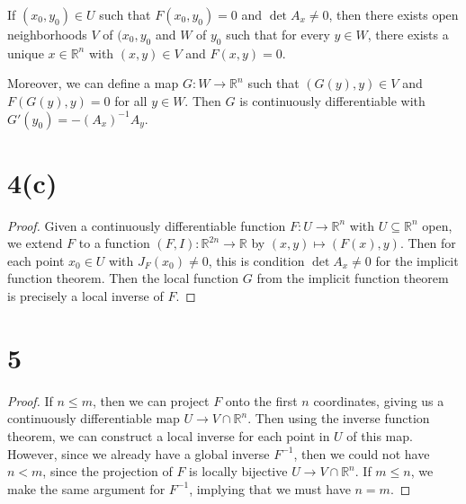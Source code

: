 \documentclass[12pt]{article}
\newcommand{\R}{\mathbb{R}}
\newcommand{\<}{\langle}
\renewcommand{\>}{\rangle}
\begin{document}
If $(x_0, y_0) \in U$ such that $F(x_0, y_0) = 0$ and $\det A_x \ne 0$, then there exists open neighborhoods $V$ of $(x_0, y_0$ and $W$ of $y_0$ such that for every $y \in W$, there exists a unique $x \in \R^n$ with $(x, y) \in V$ and $F(x, y) = 0$.

Moreover, we can define a map $G : W \to \R^n$ such that $(G(y), y) \in V$ and $F(G(y), y) = 0$ for all $y \in W$. Then $G$ is continuously differentiable with $G'(y_0) = -(A_x)^{-1}A_y$.


\section*{4(c)}

\begin{proof}
    Given a continuously differentiable function $F : U \to \R^n$ with $U \subseteq \R^n$ open, we extend $F$ to a function $(F, I) : \R^{2n} \to \R$ by $(x, y) \mapsto (F(x), y)$. Then for each point $x_0 \in U$ with $J_F(x_0) \ne 0$, this is condition $\det A_x \ne 0$ for the implicit function theorem. Then the local function $G$ from the implicit function theorem is precisely a local inverse of $F$.

\end{proof}




\newpage
\section*{5}

\begin{proof}
    If $n \leq m$, then we can project $F$ onto the first $n$ coordinates, giving us a continuously differentiable map $U \to V \cap \R^n$. Then using the inverse function theorem, we can construct a local inverse for each point in $U$ of this map. However, since we already have a global inverse $F^{-1}$, then we could not have $n < m$, since the projection of $F$ is locally bijective $U \to V \cap \R^n$. If $m \leq n$, we make the same argument for $F^{-1}$, implying that we must have $n = m$.

\end{proof}
\end{document}
